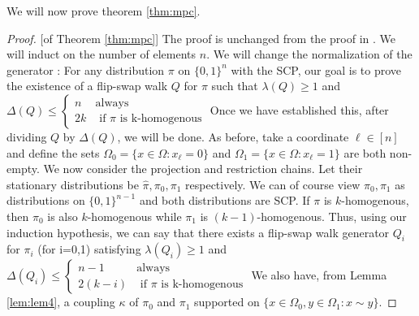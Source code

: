 We will now prove theorem \ref{thm:mpc}.
\begin{proof}{[of Theorem \ref{thm:mpc}]} The proof is unchanged from the proof in \cite{HS19}. We will induct on the number of elements $n$. We will change the normalization of the generator : For any distribution $\pi$ on $\{0,1\}^n$ with the SCP, our goal is to prove the existence of a flip-swap walk $Q$ for $\pi$ such that $\lambda(Q)\geq 1$ and $\Delta(Q)\leq \begin{cases}
n& \text{always}\\
2k&\text{ if } \pi \text{ is k-homogenous}
\end{cases}$
Once we have established this, after dividing $Q$ by $\Delta(Q)$, we will be done.
As before, take a coordinate $\ell\in[n]$ and define the sets $\Omega_0 = \{x\in\Omega : x_\ell =0\}$ and $\Omega_1 = \{x\in\Omega : x_\ell = 1\}$ are both non-empty. We now consider the projection and restriction chains. Let their stationary distributions be $\hat{\pi},\pi_0,\pi_1$ respectively. We can of course view $\pi_0,\pi_1$ as distributions on $\{ 0,1 \}^{n-1} $ and both distributions are SCP. If $\pi$ is $k$-homogenous, then $\pi_0$ is also $k$-homogenous while $\pi_1$ is $(k-1)$-homogenous. Thus, using our induction hypothesis, we can say that there exists a flip-swap walk generator $Q_i$ for $\pi_i$ (for i=0,1) satisfying $\lambda(Q_i)\geq 1$ and $\Delta(Q_i)\leq \begin{cases}
n-1& \text{always}\\
2(k-i)&\text{ if } \pi \text{ is k-homogenous}
\end{cases}$
We also have, from Lemma \ref{lem:lem4}, a coupling $\kappa$ of $\pi_0$ and $\pi_1$ supported on $\{x\in\Omega_0,y\in\Omega_1 : x\sim y\}$.
\end{proof}
